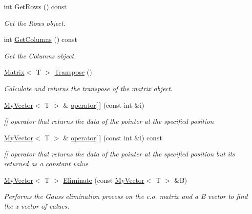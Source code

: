 \begin{DoxyCompactItemize}
int \mbox{\hyperlink{class_matrix_aa665db4bc173a7bb4ec3f9da2676dfa6}{Get\+Rows}} () const
\begin{DoxyCompactList}\small\item\em Get the Rows object. \end{DoxyCompactList}\item 
int \mbox{\hyperlink{class_matrix_ada60917bb197292e0645992e108c2c2f}{Get\+Columns}} () const
\begin{DoxyCompactList}\small\item\em Get the Columns object. \end{DoxyCompactList}\item 
\mbox{\hyperlink{class_matrix}{Matrix}}$<$ T $>$ \mbox{\hyperlink{class_matrix_a86d55a5db43b641f4e8fb2b302ccc599}{Transpose}} ()
\begin{DoxyCompactList}\small\item\em Calculate and returns the transpose of the matrix object. \end{DoxyCompactList}\item 
\mbox{\hyperlink{class_my_vector}{My\+Vector}}$<$ T $>$ \& \mbox{\hyperlink{class_matrix_aa9532c87a69bef256954e2309ca3fdd6}{operator\mbox{[}$\,$\mbox{]}}} (const int \&i)
\begin{DoxyCompactList}\small\item\em \mbox{[}\mbox{]} operator that returns the data of the pointer at the specified position \end{DoxyCompactList}\item 
\mbox{\hyperlink{class_my_vector}{My\+Vector}}$<$ T $>$ \& \mbox{\hyperlink{class_matrix_a56c7f18f272e74bee2b616eba702fc87}{operator\mbox{[}$\,$\mbox{]}}} (const int \&i) const
\begin{DoxyCompactList}\small\item\em \mbox{[}\mbox{]} operator that returns the data of the pointer at the specified position but its returned as a constant value \end{DoxyCompactList}\item 
\mbox{\hyperlink{class_my_vector}{My\+Vector}}$<$ T $>$ \mbox{\hyperlink{class_matrix_a427a50c20bb056fd20bdf2740995f8c1}{Eliminate}} (const \mbox{\hyperlink{class_my_vector}{My\+Vector}}$<$ T $>$ \&B)
\begin{DoxyCompactList}\small\item\em Performs the Gauss elimination process on the c.\+o. matrix and a B vector to find the x vector of values. \end{DoxyCompactList}\item 

\end{DoxyCompactItemize}
